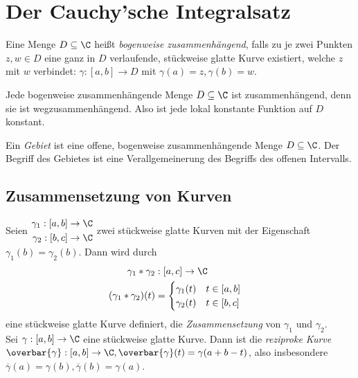 \section{Der Cauchy'sche Integralsatz}\lecture
		
		\begin{defn}
			Eine Menge $ D \subseteq \C $ heißt \emph{bogenweise zusammenhängend}, falls zu je zwei Punkten $ z,w \in D $ eine ganz in $D$ verlaufende, stückweise glatte Kurve existiert, welche $z$ mit $w$ verbindet: $ \gamma: [a,b] \to D $ mit $ \gamma(a) = z, \gamma(b)=w $.
		\end{defn}
		
		\begin{rem}
			Jede bogenweise zusammenhängende Menge $ D \subseteq \C $ ist zusammenhängend, denn sie ist wegzusammenhängend. Also ist jede lokal konstante Funktion auf $D$ konstant.
		\end{rem}
	
		\begin{defn}[Gebiet]
			Ein \emph{Gebiet} ist eine offene, bogenweise zusammenhängende Menge $ D \subseteq \C $. Der Begriff des Gebietes ist eine Verallgemeinerung des Begriffs des offenen Intervalls.
		\end{defn}
	
		\subsection*{Zusammensetzung von Kurven}
		Seien $\begin{aligned}
			\gamma_1 : [a,b] \to \C\\
			\gamma_2 : [b,c] \to \C
		\end{aligned}$ zwei stückweise glatte Kurven mit der Eigenschaft $ \gamma_1(b) = \gamma_2(b) $. Dann wird durch 
		\begin{align*}
			\gamma_1 * \gamma_2 &: [a,c] \to \C\\
			(\gamma_1 * \gamma_2)(t) &= \begin{cases}
				\gamma_1 (t) \quad t \in [a,b]\\
				\gamma_2 (t) \quad t \in [b,c]
				\end{cases}
		\end{align*}
		eine stückweise glatte Kurve definiert, die \emph{Zusammensetzung} von $\gamma_1$ und $\gamma_2$.\\
		Sei $ \gamma: [a,b] \to \C $ eine stückweise glatte Kurve. Dann ist die \emph{reziproke Kurve} $ \overbar{\gamma}: [a,b] \to \C, \overbar{\gamma}(t) = \gamma(a+b-t)$, also insbesondere $ \overbar{\gamma}(a) = \gamma(b), \overbar{\gamma}(b) = \gamma(a) $.
		
